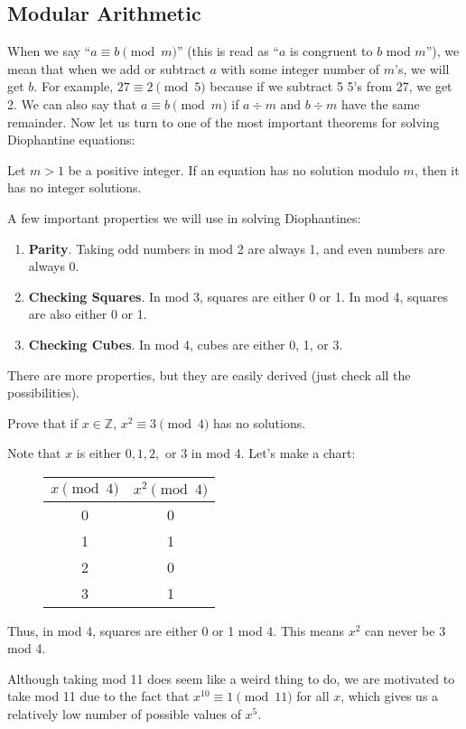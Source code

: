 \documentclass[mast]{lucky}
\begin{document}
\subsection{Modular Arithmetic}
When we say ``$a\equiv b\pmod{m}$'' (this is read as ``$a$ is congruent to $b$ mod $m$''), we mean that when we add or subtract $a$ with some integer number of $m$'s, we will get $b$. For example, $27\equiv 2\pmod{5}$ because if we subtract 5 5's from 27, we get 2. We can also say that $a\equiv b\pmod{m}$ if $a\div m$ and $b\div m$ have the same remainder. Now let us turn to one of the most important theorems for solving Diophantine equations:
\begin{theo} 
Let $m>1$ be a positive integer. If an equation has no solution modulo $m$, then it has no integer solutions.
\end{theo}
A few important properties we will use in solving Diophantines:
\begin{enumerate}
\item \textbf{Parity}. Taking odd numbers in mod 2 are always 1, and even numbers are always 0.
\item \textbf{Checking Squares}. In mod 3, squares are either 0 or 1. In mod 4, squares are also either 0 or 1. 
\item \textbf{Checking Cubes}. In mod 4, cubes are either 0, 1, or 3. 
\end{enumerate}
There are more properties, but they are easily derived (just check all the possibilities). 
\begin{exam}[Folklore]
Prove that if $x\in\mathbb{Z}$, $x^2\equiv 3\pmod{4}$ has no solutions.
\end{exam}
\begin{sol}
Note that $x$ is either $0,1,2,$ or 3 in mod 4. Let's make a chart:
\begin{figure}[H]
\centering
\begin{tabular}{c|c}
    $x\pmod{4}$ & $x^2\pmod{4}$\\
    \hline
    0 & 0\\
    1 & 1\\
    2 & 0\\
    3 & 1\\
\end{tabular}
\end{figure}
\noindent
Thus, in mod 4, squares are either 0 or 1 mod 4. This means $x^2$ can never be 3 mod 4.
\end{sol}
\begin{remark}
Although taking mod 11 does seem like a weird thing to do, we are motivated to take mod 11 due to the fact that $x^{10}\equiv1\pmod{11}$ for all $x$, which gives us a relatively low number of possible values of $x^5$.
\end{remark}
\end{document}
